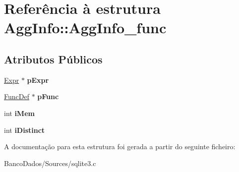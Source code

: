 \hypertarget{struct_agg_info_1_1_agg_info__func}{\section{Referência à estrutura Agg\-Info\-:\-:Agg\-Info\-\_\-func}
\label{struct_agg_info_1_1_agg_info__func}
}
\subsection*{Atributos Públicos}
\begin{DoxyCompactItemize}
\item 
\hypertarget{struct_agg_info_1_1_agg_info__func_a7b92e1c42e60d44e28ebf695316f4018}{\hyperlink{struct_expr}{Expr} $\ast$ {\bfseries p\-Expr}}\label{struct_agg_info_1_1_agg_info__func_a7b92e1c42e60d44e28ebf695316f4018}

\item 
\hypertarget{struct_agg_info_1_1_agg_info__func_a840478e8ec53cefa57b50228f6fdafe4}{\hyperlink{struct_func_def}{Func\-Def} $\ast$ {\bfseries p\-Func}}\label{struct_agg_info_1_1_agg_info__func_a840478e8ec53cefa57b50228f6fdafe4}

\item 
\hypertarget{struct_agg_info_1_1_agg_info__func_a41a8da36555c37fffc65f1acead49a4f}{int {\bfseries i\-Mem}}\label{struct_agg_info_1_1_agg_info__func_a41a8da36555c37fffc65f1acead49a4f}

\item 
\hypertarget{struct_agg_info_1_1_agg_info__func_a4a82635b0116eb44ec8ca9e47cc509d9}{int {\bfseries i\-Distinct}}\label{struct_agg_info_1_1_agg_info__func_a4a82635b0116eb44ec8ca9e47cc509d9}

\end{DoxyCompactItemize}


A documentação para esta estrutura foi gerada a partir do seguinte ficheiro\-:\begin{DoxyCompactItemize}
\item 
Banco\-Dados/\-Sources/sqlite3.\-c\end{DoxyCompactItemize}
